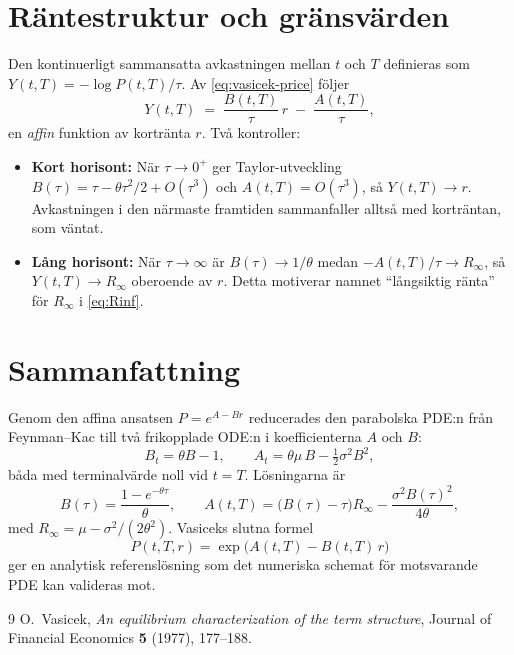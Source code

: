 \documentclass[11pt,a4paper]{article}
\theoremstyle{plain}
\theoremstyle{definition}
\theoremstyle{remark}
\begin{document}
\section{Räntestruktur och gränsvärden}

Den kontinuerligt sammansatta avkastningen mellan $t$ och $T$ definieras som $Y(t,T) = -\log P(t,T)/\tau$. Av \eqref{eq:vasicek-price} följer
\begin{equation}
    Y(t,T) \;=\; \frac{B(t,T)}{\tau}\,r \;-\; \frac{A(t,T)}{\tau},
    \label{eq:yield}
\end{equation}
en \emph{affin} funktion av kortränta $r$. Två kontroller:
\begin{itemize}
    \item \textbf{Kort horisont:} När $\tau\to 0^+$ ger Taylor-utveckling $B(\tau) = \tau - \theta\tau^2/2 + O(\tau^3)$ och $A(t,T) = O(\tau^3)$, så $Y(t,T) \to r$. Avkastningen i den närmaste framtiden sammanfaller alltså med korträntan, som väntat.
    \item \textbf{Lång horisont:} När $\tau\to\infty$ är $B(\tau)\to 1/\theta$ medan $-A(t,T)/\tau \to R_\infty$, så $Y(t,T) \to R_\infty$ oberoende av $r$. Detta motiverar namnet ``långsiktig ränta'' för $R_\infty$ i \eqref{eq:Rinf}.
\end{itemize}

\section{Sammanfattning}

Genom den affina ansatsen $P = e^{A - Br}$ reducerades den parabolska PDE:n från Feynman--Kac till två frikopplade ODE:n i koefficienterna $A$ och $B$:
\[
    B_t = \theta B - 1, \qquad A_t = \theta\mu\,B - \tfrac12\sigma^2 B^2,
\]
båda med terminalvärde noll vid $t=T$. Lösningarna är
\[
    B(\tau) = \frac{1 - e^{-\theta\tau}}{\theta}, \qquad
    A(t,T) = \bigl(B(\tau) - \tau\bigr)R_\infty - \frac{\sigma^2 B(\tau)^2}{4\theta},
\]
med $R_\infty = \mu - \sigma^2/(2\theta^2)$. Vasiceks slutna formel
\[
    P(t,T,r) = \exp\!\bigl(A(t,T) - B(t,T)\,r\bigr)
\]
ger en analytisk referenslösning som det numeriska schemat för motsvarande PDE kan valideras mot.

\begin{thebibliography}{9}
O.~Vasicek, \emph{An equilibrium characterization of the term structure}, Journal of Financial Economics \textbf{5} (1977), 177--188.
\end{thebibliography}
\end{document}
